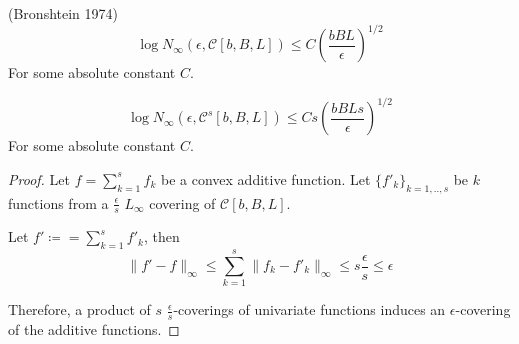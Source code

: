 \documentclass{article}
\begin{document}
\begin{lemma} (Bronshtein 1974)
\[
\log N_\infty (\epsilon, \mathcal{C}[b,B,L]) \leq C\left( \frac{bBL}{\epsilon} \right)^{1/2}
\]
For some absolute constant $C$.
\end{lemma}

\begin{lemma}
\[
\log N_\infty( \epsilon, \mathcal{C}^s[b,B,L])  \leq C s \left(\frac{bBLs}{\epsilon}\right)^{1/2}
\]
For some absolute constant $C$.
\end{lemma}

\begin{proof}
Let $f = \sum_{k=1}^s f_k$ be a convex additive function. Let $\{ f'_k \}_{k=1,..,s}$ be $k$ functions from a $\frac{\epsilon}{s}$ $L_\infty$ covering of $\mathcal{C}[b,B,L]$. 

Let $f' \coloneqq = \sum_{k=1}^s f'_k$, then 
\[
\| f' - f \|_{\infty} \leq \sum_{k=1}^s \| f_k - f'_k \|_\infty \leq s \frac{\epsilon}{s} \leq \epsilon
\]

Therefore, a product of $s$ $\frac{\epsilon}{s}$-coverings of univariate functions induces an $\epsilon$-covering of the additive functions.
\end{proof}
\end{document}
